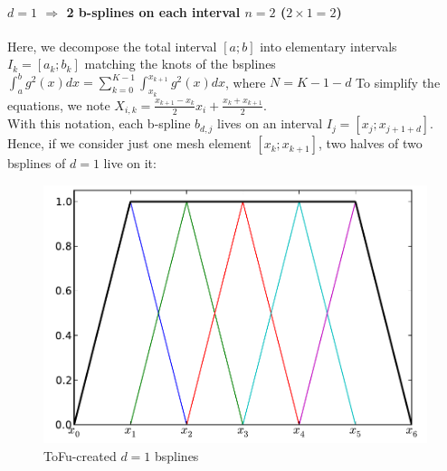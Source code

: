 \documentclass[paper=a4, fontsize=11pt]{book}
\numberwithin{equation}{section}		%
\numberwithin{figure}{section}			%
\numberwithin{table}{section}				%
\begin{document}
\newpage
\begin{landscape}


\paragraph{\textbf{$d=1$ $\Rightarrow$ 2 b-splines on each interval $n=2$ ($2\times1=2$)}}
Here, we decompose the total interval $[a;b]$ into elementary intervals $I_k=[a_k;b_k]$ matching the knots of the bsplines $\int_a^b g^2(x)dx = \sum_{k=0}^{K-1} \int_{x_k}^{x_{k+1}} g^2(x)dx$, where $N=K-1-d$
To simplify the equations, we note $X_{i,k} = \frac{x_{k+1}-x_k}{2}x_i + \frac{x_k+x_{k+1}}{2}$.\\
With this notation, each b-spline $b_{d,j}$ lives on an interval $I_j = [x_{j};x_{j+1+d}]$.
Hence, if we consider just one mesh element $[x_k;x_{k+1}]$, two halves of two bsplines of $d=1$ live on it:

\begin{figure}
  \vspace{-20pt}
  \begin{center}
    \includegraphics[scale=0.4]{Fig00_BSplines_Int_D1.pdf}
  \end{center}
  \vspace{-20pt}
  \caption{\footnotesize ToFu-created $d=1$ bsplines}
  \vspace{-10pt}
\end{figure}


\end{landscape}
\end{document}
